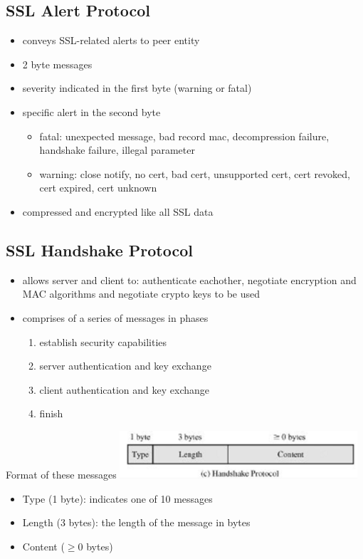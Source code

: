 \documentclass{article}
\begin{document}
\subsection{SSL Alert Protocol}
\begin{itemize}
    \item conveys SSL-related alerts to peer entity
    \item 2 byte messages
    \item severity indicated in the first byte (warning or fatal)
    \item specific alert in the second byte
    \begin{itemize}
        \item fatal: unexpected message, bad record mac, decompression failure, handshake failure, illegal parameter
        \item warning: close notify, no cert, bad cert, unsupported cert, cert revoked, cert expired, cert unknown
    \end{itemize}
    \item compressed and encrypted like all SSL data
\end{itemize}
\subsection{SSL Handshake Protocol}
\begin{itemize}
    \item allows server and client to: authenticate eachother, negotiate encryption and MAC algorithms and negotiate crypto keys to be used
    \item comprises of a series of messages in phases
    \begin{enumerate}
        \item establish security capabilities
        \item server authentication and key exchange
        \item client authentication and key exchange
        \item finish
    \end{enumerate}
\end{itemize}
Format of these messages
\includegraphics[width= 250pt]{sslHP.png}
\begin{itemize}
    \item Type (1 byte): indicates one of 10 messages
    \item Length (3 bytes): the length of the message in bytes
    \item Content ($\geq0$ bytes)
\end{itemize}
\end{document}
